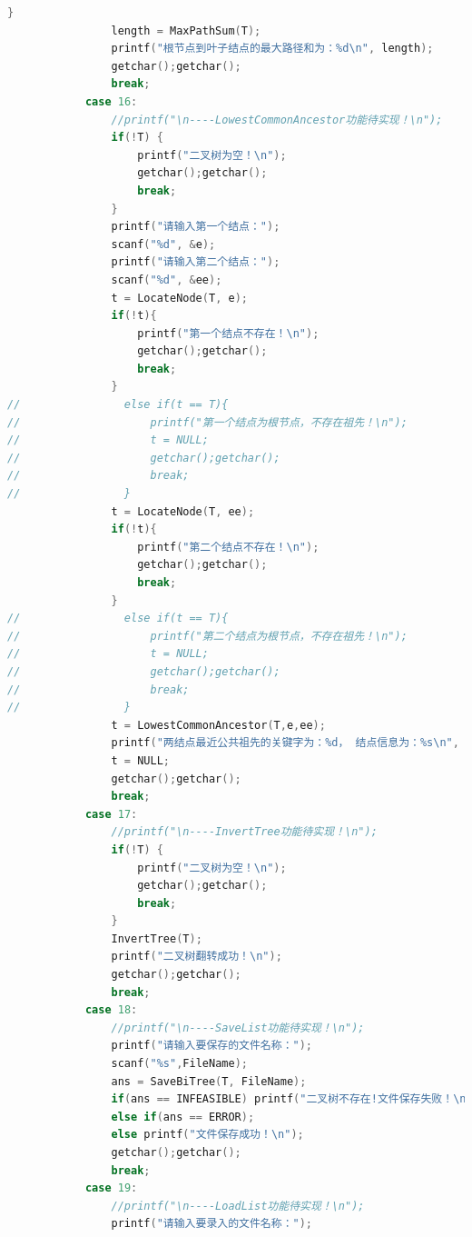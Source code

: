 \documentclass[supercite]{Experimental_Report}
\theoremstyle{definition}
\begin{document}
\begin{lstlisting}[language=c]
                }
                length = MaxPathSum(T);
                printf("根节点到叶子结点的最大路径和为：%d\n", length);
                getchar();getchar();
                break;
            case 16:
                //printf("\n----LowestCommonAncestor功能待实现！\n");
                if(!T) {
                    printf("二叉树为空！\n");
                    getchar();getchar();
                    break;
                }
                printf("请输入第一个结点：");
                scanf("%d", &e);
                printf("请输入第二个结点：");
                scanf("%d", &ee);
                t = LocateNode(T, e);
                if(!t){
                    printf("第一个结点不存在！\n");
                    getchar();getchar();
                    break;
                }
//                else if(t == T){
//                    printf("第一个结点为根节点，不存在祖先！\n");
//                    t = NULL;
//                    getchar();getchar();
//                    break;
//                }
                t = LocateNode(T, ee);
                if(!t){
                    printf("第二个结点不存在！\n");
                    getchar();getchar();
                    break;
                }
//                else if(t == T){
//                    printf("第二个结点为根节点，不存在祖先！\n");
//                    t = NULL;
//                    getchar();getchar();
//                    break;
//                }
                t = LowestCommonAncestor(T,e,ee);
                printf("两结点最近公共祖先的关键字为：%d， 结点信息为：%s\n", t->data.key, t->data.others);
                t = NULL;
                getchar();getchar();
                break;
            case 17:
                //printf("\n----InvertTree功能待实现！\n");
                if(!T) {
                    printf("二叉树为空！\n");
                    getchar();getchar();
                    break;
                }
                InvertTree(T);
                printf("二叉树翻转成功！\n");
                getchar();getchar();
                break;
            case 18:
                //printf("\n----SaveList功能待实现！\n");
                printf("请输入要保存的文件名称：");
                scanf("%s",FileName);
                ans = SaveBiTree(T, FileName);
                if(ans == INFEASIBLE) printf("二叉树不存在!文件保存失败！\n");
                else if(ans == ERROR);
                else printf("文件保存成功！\n");
                getchar();getchar();
                break;
            case 19:
                //printf("\n----LoadList功能待实现！\n");
                printf("请输入要录入的文件名称：");

\end{lstlisting}
\end{document}

